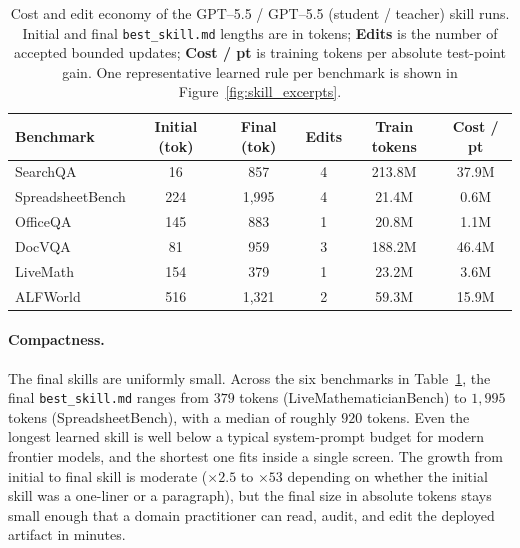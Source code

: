 \begin{table}[t]
\centering
\footnotesize
\setlength{\tabcolsep}{5pt}
\renewcommand{\arraystretch}{0.95}
\begin{tabular}{l c c c c c}
\toprule
\textbf{Benchmark} & \textbf{Initial (tok)} & \textbf{Final (tok)} & \textbf{Edits} & \textbf{Train tokens} & \textbf{Cost / pt} \\
\midrule
SearchQA         & 16  & 857     & 4 & 213.8M & 37.9M \\
SpreadsheetBench & 224 & 1{,}995 & 4 & 21.4M  & 0.6M  \\
OfficeQA         & 145 & 883     & 1 & 20.8M  & 1.1M  \\
DocVQA           & 81  & 959     & 3 & 188.2M & 46.4M \\
LiveMath         & 154 & 379     & 1 & 23.2M  & 3.6M  \\
ALFWorld         & 516 & 1{,}321 & 2 & 59.3M  & 15.9M \\
\bottomrule
\end{tabular}
\caption{Cost and edit economy of the GPT--5.5 / GPT--5.5 (student / teacher) skill runs. Initial and final \texttt{best\_skill.md} lengths are in tokens; \textbf{Edits} is the number of accepted bounded updates; \textbf{Cost / pt} is training tokens per absolute test-point gain. One representative learned rule per benchmark is shown in Figure~\ref{fig:skill_excerpts}.}
\label{tab:skill_cost_case}
\end{table}

\paragraph{Compactness.}
The final skills are uniformly small. Across the six benchmarks in Table~\ref{tab:skill_cost_case}, the final \texttt{best\_skill.md} ranges from $379$ tokens (LiveMathematicianBench) to $1{,}995$ tokens (SpreadsheetBench), with a median of roughly $920$ tokens. Even the longest learned skill is well below a typical system-prompt budget for modern frontier models, and the shortest one fits inside a single screen. The growth from initial to final skill is moderate ($\times 2.5$ to $\times 53$ depending on whether the initial skill was a one-liner or a paragraph), but the final size in absolute tokens stays small enough that a domain practitioner can read, audit, and edit the deployed artifact in minutes.


